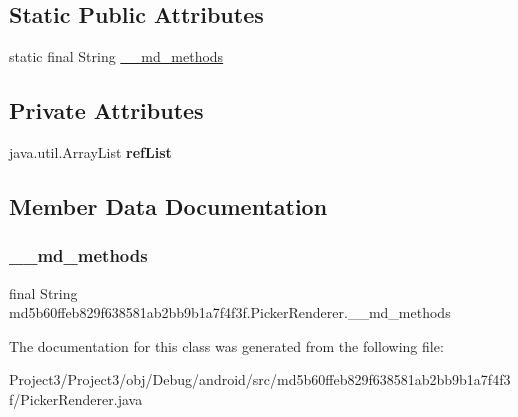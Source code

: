 \subsection*{Static Public Attributes}
\begin{DoxyCompactItemize}
\item 
static final String \hyperlink{classmd5b60ffeb829f638581ab2bb9b1a7f4f3f_1_1PickerRenderer_a8a968a337192314e31ec4d605077182c}{\+\_\+\+\_\+md\+\_\+methods}
\end{DoxyCompactItemize}
\subsection*{Private Attributes}
\begin{DoxyCompactItemize}
\item 
\mbox{\label{classmd5b60ffeb829f638581ab2bb9b1a7f4f3f_1_1PickerRenderer_a7de5daff58c215b987daa2f1c47cdee5}} 
java.\+util.\+Array\+List {\bfseries ref\+List}
\end{DoxyCompactItemize}


\subsection{Member Data Documentation}
\mbox{\label{classmd5b60ffeb829f638581ab2bb9b1a7f4f3f_1_1PickerRenderer_a8a968a337192314e31ec4d605077182c}} 
\subsubsection{\texorpdfstring{\+\_\+\+\_\+md\+\_\+methods}{\_\_md\_methods}}
{\footnotesize\ttfamily final String md5b60ffeb829f638581ab2bb9b1a7f4f3f.\+Picker\+Renderer.\+\_\+\+\_\+md\+\_\+methods\hspace{0.3cm}{\ttfamily [static]}}



The documentation for this class was generated from the following file\+:\begin{DoxyCompactItemize}
\item 
Project3/\+Project3/obj/\+Debug/android/src/md5b60ffeb829f638581ab2bb9b1a7f4f3f/Picker\+Renderer.\+java\end{DoxyCompactItemize}
